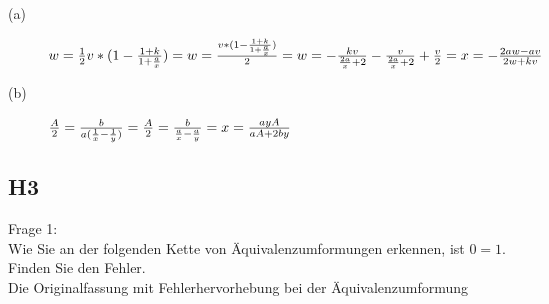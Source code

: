 \documentclass[12pt,a4paper]{article}
\begin{document}
\begin{description}
\item[(a)]{$w\\= \frac{1}{2} v * (1 - \frac{1 + k}{1 + \frac{a}{x}})\\= w\\= \frac{v * (1 - \frac{1 + k}{1 + \frac{a}{x}})}{2}\\= w\\= - \frac{kv}{\frac{2a}{x} + 2} - \frac{v}{\frac{2a}{x} + 2} + \frac{v}{2}\\= x\\= - \frac{2aw - av}{2w + kv}$}
\item[(b)]{$\frac{A}{2}\\= \frac{b}{a(\frac{1}{x} - \frac{1}{y})}\\= \frac{A}{2}\\= \frac{b}{\frac{a}{x} - \frac{a}{y}}\\= x\\= \frac{ayA}{aA + 2by}$}
\end{description}

\subsection{H3}

Frage 1:
\\[2ex]
Wie Sie an der folgenden Kette von Äquivalenzumformungen erkennen, ist $0 = 1$. Finden Sie den Fehler.
\\[2ex]
Die Originalfassung mit Fehlerhervorhebung bei der Äquivalenzumformung
\end{document}
